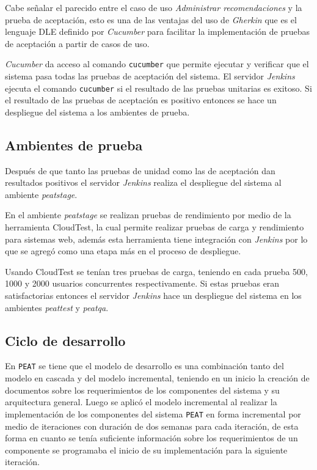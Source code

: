 Cabe señalar el parecido entre el caso de uso \textit{Administrar recomendaciones}
y la prueba de aceptación, esto es una de las ventajas del uso de \textit{Gherkin}
que es el lenguaje DLE definido por \textit{Cucumber} para facilitar la
implementación de pruebas de aceptación a partir de casos de uso.

\textit{Cucumber} da acceso al comando \texttt{cucumber} que permite ejecutar y
verificar que el sistema pasa todas las pruebas de aceptación del sistema.
El servidor \textit{Jenkins} ejecuta el comando \texttt{cucumber} si el resultado
de las pruebas unitarias es exitoso. Si el resultado de las pruebas de aceptación es
positivo entonces se hace un despliegue del sistema a los ambientes de prueba.

\subsection{Ambientes de prueba}

Después de que tanto las pruebas de unidad como las de aceptación dan resultados
positivos el servidor \textit{Jenkins} realiza el despliegue del sistema al ambiente
\textit{peatstage}.

En el ambiente \textit{peatstage} se realizan pruebas de rendimiento por medio
de la herramienta CloudTest, la cual permite realizar pruebas de carga y
rendimiento para sistemas web, además esta herramienta tiene integración con
\textit{Jenkins} por lo que se agregó como una etapa más en el proceso de despliegue.

Usando CloudTest se tenían tres pruebas de carga, teniendo en cada prueba 500, 1000
y 2000 usuarios concurrentes respectivamente. Si estas pruebas eran satisfactorias
entonces el servidor \textit{Jenkins} hace un despliegue del sistema en los
ambientes \textit{peattest} y \textit{peatqa}.

\subsection{Ciclo de desarrollo}

En \texttt{PEAT} se tiene que el modelo de desarrollo es una combinación tanto del
modelo en cascada y del modelo incremental, teniendo en un inicio la creación de
documentos sobre los requerimientos de los componentes del sistema y su
arquitectura general. Luego se aplicó el modelo incremental al realizar la
implementación de los componentes del sistema \texttt{PEAT} en forma incremental por
medio de iteraciones con duración de dos semanas para cada iteración, de esta forma
en cuanto se tenía suficiente información sobre los requerimientos de un componente
se programaba el inicio de su implementación para la siguiente iteración.

